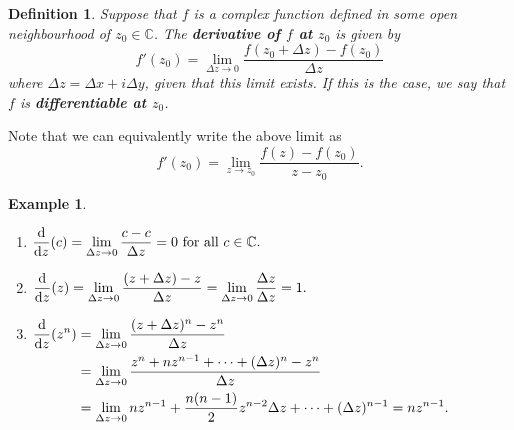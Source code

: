\documentclass[10pt]{article}
\newcommand{\C}{\mathbb{C}}
\theoremstyle{newstyle}
\newtheorem{defn}[thm]{Definition}
\newtheorem{exmp}[thm]{Example}
\begin{document}
\begin{defn}
Suppose that $f$ is a complex function defined in some open neighbourhood of $z_0 \in \C$.
The {\bf derivative of $f$ at $z_0$} is given by 
\[ f'(z_0) = \lim_{\Delta z \to 0} \frac{f(z_0 + \Delta z) - f(z_0)}{\Delta z} \]
where $\Delta z = \Delta x + i\Delta y$, given that this limit exists. If this is the case, 
we say that $f$ is {\bf differentiable at $z_0$}.
\end{defn}

Note that we can equivalently write the above limit as 
\[ f'(z_0) = \lim_{z\to z_0} \frac{f(z) - f(z_0)}{z - z_0}. \]

\begin{exmp}~
\begin{enumerate}[(1)]
    \item $\begin{aligned}[t]
    \frac{\rm d}{{\rm d}z}(c) = \lim_{\Delta z \to 0} \frac{c-c}{\Delta z} = 0 
    \text{ for all $c \in \C$}.
    \end{aligned}$
    \item $\begin{aligned}[t]
    \frac{\rm d}{{\rm d}z}(z) = \lim_{\Delta z \to 0} \frac{(z+\Delta z) - z}{\Delta z} = 
    \lim_{\Delta z \to 0} \frac{\Delta z}{\Delta z} = 1.
    \end{aligned}$
    \item $\begin{aligned}[t]
    \frac{\rm d}{{\rm d}z}(z^n) &= \lim_{\Delta z \to 0} \frac{(z+\Delta z)^n - z^n}{\Delta z} \\
    &= \lim_{\Delta z \to 0} \frac{z^n + nz^{n-1} + \cdots + (\Delta z)^n - z^n}{\Delta z} \\
    &= \lim_{\Delta z \to 0} nz^{n-1} + \frac{n(n-1)}2 z^{n-2}\Delta z + \cdots + (\Delta z)^{n-1}
    = nz^{n-1}.
    \end{aligned}$
\end{enumerate}
\end{exmp}
\end{document}
